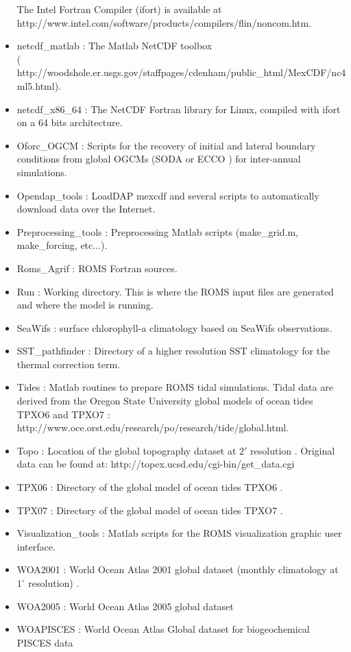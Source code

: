 \begin{itemize}
      The Intel Fortran Compiler (ifort) is available at \\
      http://www.intel.com/software/products/compilers/flin/noncom.htm.
\item netcdf\_matlab : The Matlab NetCDF toolbox  \\
      ({\small
      http://woodshole.er.usgs.gov/staffpages/cdenham/public\_html/MexCDF/nc4ml5.html}).
\item netcdf\_x86\_64 : The NetCDF Fortran library for Linux, compiled with ifort
      on a 64 bits architecture.
\item Oforc\_OGCM : Scripts for the recovery of initial and lateral boundary 
      conditions from global OGCMs (SODA \citep{Car05} or ECCO \citep{Sta99}) for 
      inter-annual simulations.
\item Opendap\_tools : LoadDAP mexcdf and several scripts to automatically
      download data over the Internet.
\item Preprocessing\_tools : Preprocessing Matlab scripts (make\_grid.m, 
      make\_forcing, etc...).
\item Roms\_Agrif : ROMS Fortran sources.
\item Run : Working directory. This is where the ROMS input files
      are generated and where the model is running.
\item SeaWifs : surface chlorophyll-a climatology based on SeaWifs observations.
\item SST\_pathfinder : Directory of a higher resolution SST climatology 
      \citep{Rey94} for the thermal correction term.
\item Tides : Matlab routines to prepare ROMS tidal simulations. Tidal data
      are derived from the Oregon State University global models of ocean tides 
      TPXO6 and TPXO7 \citep{Egb02}: 
      http://www.oce.orst.edu/research/po/research/tide/global.html.
\item Topo : Location of the global topography dataset at $2'$ resolution
      \citep{Smi97}. Original data can be found at:
      http://topex.ucsd.edu/cgi-bin/get\_data.cgi
\item TPX06 : Directory of the global model of ocean tides TPXO6 \citep{Egb02}.
\item TPX07 : Directory of the global model of ocean tides TPXO7 \citep{Egb02}.
\item Visualization\_tools : Matlab scripts for the ROMS visualization
      graphic user interface.
\item WOA2001 : World Ocean Atlas 2001 global dataset 
      (monthly climatology at $1^\circ$ resolution) \citep{Con02}.
\item WOA2005 : World Ocean Atlas 2005 global dataset 
\item WOAPISCES : World Ocean Atlas Global dataset for biogeochemical PISCES data

\end{itemize}



